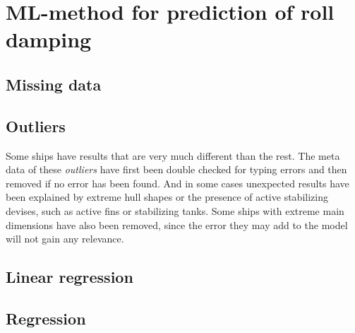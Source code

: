 \section{ML-method for prediction of roll damping}
\label{se:regression} 

\subsection{Missing data}


\subsection{Outliers}
Some ships have results that are very much different than the rest. The meta data of these  \emph{outliers} have first been double checked for typing errors and then removed if no error has been found. And in some cases unexpected results have been explained by extreme hull shapes or the presence of active stabilizing devises, such as active fins or stabilizing tanks.
Some ships with extreme main dimensions have also been removed, since the error they may add to the model will not gain any relevance.


\subsection{Linear regression}

\subsection{Regression}